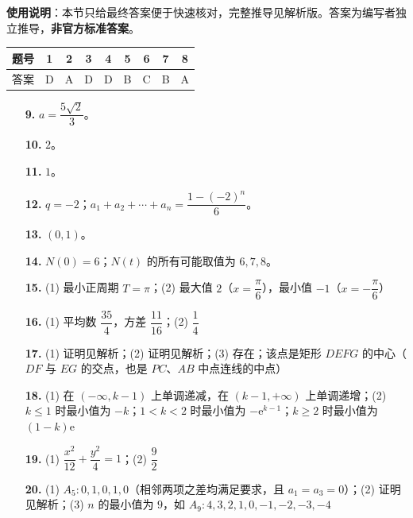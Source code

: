 
\begin{gknotice}
\textbf{使用说明}：本节只给最终答案便于快速核对，完整推导见解析版。答案为编写者独立推导，\textbf{非官方标准答案}。
\end{gknotice}

\begin{center}\begin{tabular}{ccccccccc}
\toprule
题号 & 1 & 2 & 3 & 4 & 5 & 6 & 7 & 8 \\
\midrule
答案 & D & A & D & D & B & C & B & A \\
\bottomrule
\end{tabular}\end{center}

\begin{itemize}[leftmargin=2.6em]
  \item[\textbf{9.}] $a=\dfrac{5\sqrt2}{3}$。
  \item[\textbf{10.}] $2$。
  \item[\textbf{11.}] $1$。
  \item[\textbf{12.}] $q=-2$；$a_1+a_2+\cdots+a_n=\dfrac{1-(-2)^n}{6}$。
  \item[\textbf{13.}] $(0,1)$。
  \item[\textbf{14.}] $N(0)=6$；$N(t)$ 的所有可能取值为 $6,7,8$。
\end{itemize}

\begin{itemize}[leftmargin=2.6em]
  \item[\textbf{15.}] (1) 最小正周期 $T=\pi$；(2) 最大值 $2$（$x=\dfrac{\pi}{6}$），最小值 $-1$（$x=-\dfrac{\pi}{6}$）
  \item[\textbf{16.}] (1) 平均数 $\dfrac{35}{4}$，方差 $\dfrac{11}{16}$；(2) $\dfrac14$
  \item[\textbf{17.}] (1) 证明见解析；(2) 证明见解析；(3) 存在；该点是矩形 $DEFG$ 的中心（$DF$ 与 $EG$ 的交点，也是 $PC$、$AB$ 中点连线的中点）
  \item[\textbf{18.}] (1) 在 $(-\infty,k-1)$ 上单调递减，在 $(k-1,+\infty)$ 上单调递增；(2) $k\leqslant1$ 时最小值为 $-k$；$1<k<2$ 时最小值为 $-\mathrm{e}^{k-1}$；$k\geqslant2$ 时最小值为 $(1-k)\mathrm{e}$
  \item[\textbf{19.}] (1) $\dfrac{x^2}{12}+\dfrac{y^2}{4}=1$；(2) $\dfrac92$
  \item[\textbf{20.}] (1) $A_5:0,1,0,1,0$（相邻两项之差均满足要求，且 $a_1=a_3=0$）；(2) 证明见解析；(3) $n$ 的最小值为 $9$，如 $A_9:4,3,2,1,0,-1,-2,-3,-4$
\end{itemize}
